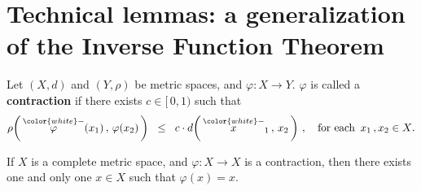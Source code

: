 

\section{Technical lemmas: a generalization of the Inverse Function Theorem}
\setcounter{theorem}{0}
\setcounter{equation}{0}


\renewcommand{\theenumi}{\roman{enumi}}
\renewcommand{\labelenumi}{\textnormal{(\theenumi)}$\;\;$}


\begin{definition}
\mbox{}\vskip 0.1cm
\noindent
Let $(X,d)$ and $(Y,\rho)$ be metric spaces, and $\varphi : X \longrightarrow Y$.
$\varphi$ is called a \textbf{contraction} if there exists $c \in [\,0,1)$
such that
\begin{equation*}
\rho\!\left(\,\overset{{\color{white}-}}{\varphi}(x_{1}) \,,\, \varphi(x_{2})\,\right)
\;\; \leq \;\;
	c \cdot d\!\left(\,\overset{{\color{white}-}}{x}_{1} \,,\, x_{2}\,\right)\,,
\quad
\textnormal{for each \,$x_{1}\,, x_{2} \in X$}.
\end{equation*}

\end{definition}

\begin{theorem}
\mbox{}\vskip 0.1cm
\noindent
If $X$ is a complete metric space, and
$\varphi : X \longrightarrow X$ is a contraction,
then there exists one and only one $x \in X$ such that $\varphi(x) = x$.
\end{theorem}

